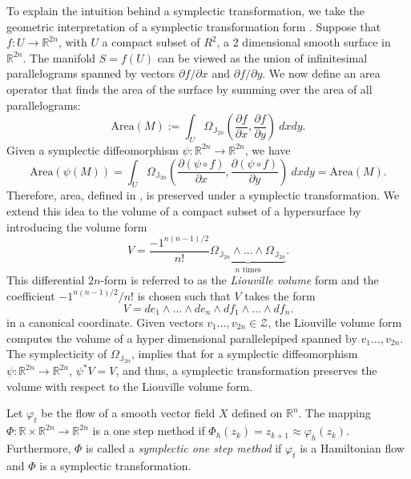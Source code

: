 To explain the intuition behind a symplectic transformation, we take the geometric interpretation of a symplectic transformation form \cite{hairer2006geometric}. Suppose that $f:U \to \mathbb R^{2n}$, with $U$ a compact subset of $R^{2}$, a 2 dimensional smooth surface in $\mathbb R^{2n}$. The manifold $S = f(U)$ can be viewed as the union of infinitesimal parallelograms spanned by vectors ${\partial f}/{\partial x}$ and ${\partial f}/{\partial y}$. We now define an area operator that finds the area of the surface by summing over the area of all parallelograms:
\begin{equation} \label{eq:2.21}
	\text{Area}(M) := \int_U \Omega_{\mathbb J_{2n}}( \frac{\partial f}{\partial x} , \frac{\partial f}{\partial y} ) \ dx dy.
\end{equation}
Given a symplectic diffeomorphism $\psi:\mathbb R^{2n} \to \mathbb R^{2n}$, we have
\begin{equation*}
	\text{Area}(\psi(M)) = \int_U \Omega_{\mathbb J_{2n}}( \frac{\partial (\psi \circ f) }{\partial x} , \frac{\partial (\psi \circ f)}{\partial y} ) \ dx dy = \text{Area}(M).
\end{equation*}
Therefore, area, defined in , is preserved under a symplectic transformation. We extend this idea to the volume of a compact subset of a hypersurface by introducing the volume form
\begin{equation*}
	V = \frac{-1^{n(n-1)/2}}{n!} \underbrace{\Omega_{\mathbb J_{2n}} \wedge \dots \wedge \Omega_{\mathbb J_{2n}}}_{n \text{ times}}.
\end{equation*}
This differential $2n$-form is referred to as the  \emph{Liouville volume} \cite{marsden2013introduction} form and the coefficient ${-1^{n(n-1)/2}}/{n!}$ is chosen such that $V$ takes the form
\begin{equation}\label{eq:2.22}
	V = de_1 \wedge \dots \wedge de_n \wedge df_1 \wedge \dots \wedge df_n. 
\end{equation}
in a canonical coordinate. Given vectors $v_1\dots,v_{2n}\in \mathcal Z$, the Liouville volume form computes the volume of a hyper dimensional parallelepiped spanned by $v_1\dots,v_{2n}$. The symplecticity of $\Omega_{\mathbb J_{2n}}$, implies that for a symplectic diffeomorphism $\psi:\mathbb R^{2n} \to \mathbb{R}^{2n}$, $\psi^*V = V$, and thus, a symplectic transformation preserves the volume with respect to the Liouville volume form.

\begin{definition}
Let $\varphi_t$ be the flow of a smooth vector field $X$ defined on $\mathbb R^{n}$. The mapping $\Phi:\mathbb R \times \mathbb R^{2n} \to \mathbb R^{2n}$ is a one step method if $\Phi_h (z_k) = z_{k+1} \approx \varphi_h(z_k)$. Furthermore, $\Phi$ is called a \emph{symplectic one step method} if $\varphi_t$ is a Hamiltonian flow and $\Phi$ is a symplectic transformation.
\end{definition}

